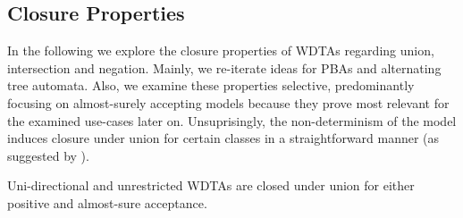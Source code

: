 \subsection{Closure Properties}
In the following we explore the closure properties of \acp{WDTA} regarding 
union, intersection and negation. Mainly, we re-iterate ideas for \acp{PBA} and
alternating tree automata. Also, we examine these properties selective, 
predominantly focusing on almost-surely accepting models because they prove
most relevant for the examined use-cases later on. Unsuprisingly, the 
non-determinism of the model induces closure under union for certain classes in 
a straightforward manner (as suggested by 
\cite[Proposition 14]{RandAutoInfTrees}). 
\begin{proposition}
  Uni-directional and unrestricted \acp{WDTA} are closed under union for 
  either positive and almost-sure acceptance.
  \label{prop:uniunrunion}
\end{proposition}
